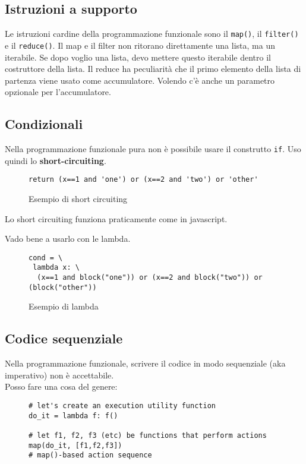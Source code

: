 \documentclass[a4paper,12pt]{article}
\begin{document}
\subsection{Istruzioni a supporto}
Le istruzioni cardine della programmazione funzionale sono il \texttt{map()}, il \texttt{filter()} e il \texttt{reduce()}. Il map e il filter non ritorano direttamente una lista, ma un iterabile. Se dopo voglio una lista, devo mettere questo iterabile dentro il costruttore della lista. Il reduce ha peculiarità che il primo elemento della lista di partenza viene usato come accumulatore. Volendo c'è anche un parametro opzionale per l'accumulatore.

\subsection{Condizionali}
Nella programmazione funzionale pura non è possibile usare il construtto \texttt{if}. Uso quindi lo \textbf{short-circuiting}.
\begin{figure}[H]
\begin{lstlisting}
return (x==1 and 'one') or (x==2 and 'two') or 'other'
\end{lstlisting}
\caption{Esempio di short circuiting}
\end{figure}
Lo short circuiting funziona praticamente come in javascript.

Vado bene a usarlo con le lambda.
\begin{figure}[H]
\begin{lstlisting}
cond = \
 lambda x: \
  (x==1 and block("one")) or (x==2 and block("two")) or (block("other"))
\end{lstlisting}
\caption{Esempio di lambda}
\end{figure}

\subsection{Codice sequenziale}
Nella programmazione funzionale, scrivere il codice in modo sequenziale (aka imperativo) non è accettabile.\\
Posso fare una cosa del genere:
\begin{figure}[H]
\begin{lstlisting}
# let's create an execution utility function
do_it = lambda f: f()

# let f1, f2, f3 (etc) be functions that perform actions
map(do_it, [f1,f2,f3])
# map()-based action sequence
\end{lstlisting}
\end{figure}
\end{document}
